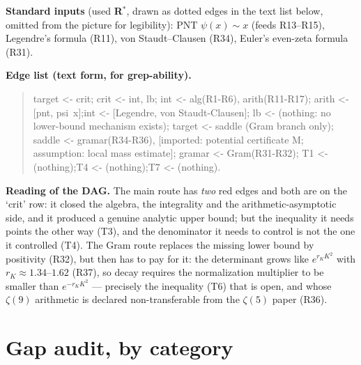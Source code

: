 \documentclass[11pt]{article}
\newcommand{\stC}{\textcolor{okgreen}{\textbf{R$^{*}$}}}
\begin{document}
\begin{center}
\end{center}

\noindent\textbf{Standard inputs} (used \stC, drawn as dotted edges in the text list below, omitted
from the picture for legibility): PNT $\psi(x)\sim x$ (feeds R13--R15), Legendre's formula (R11),
von Staudt--Clausen (R34), Euler's even-zeta formula (R31).

\noindent\textbf{Edge list (text form, for grep-ability).}
\begin{quote}\ttfamily\small
target <- crit;\newline
crit <- int, lb;\newline
int <- alg(R1-R6), arith(R11-R17);\newline
arith <- [pnt, psi~x];\quad int <- [Legendre, von Staudt-Clausen];\newline
lb <- (nothing: no lower-bound mechanism exists);\newline
target <- saddle (Gram branch only);\newline
saddle <- gramar(R34-R36), [imported: potential certificate M; assumption: local mass estimate];\newline
gramar <- Gram(R31-R32);\newline
T1 <- (nothing);\quad T4 <- (nothing);\quad T7 <- (nothing).
\end{quote}

\noindent\textbf{Reading of the DAG.} The main route has \emph{two} red edges and both are on the
`crit' row: it closed the algebra, the integrality and the arithmetic-asymptotic side, and it
produced a genuine analytic upper bound; but the inequality it needs points the other way (T3), and
the denominator it needs to control is not the one it controlled (T4). The Gram route replaces the
missing lower bound by positivity (R32), but then has to pay for it: the determinant grows like
$e^{r_KK^{2}}$ with $r_K\approx1.34$--$1.62$ (R37), so decay requires the normalization multiplier to
be smaller than $e^{-r_KK^{2}}$ --- precisely the inequality (T6) that is open, and whose $\zeta(9)$
arithmetic is declared non-transferable from the $\zeta(5)$ paper (R36).

\section{Gap audit, by category}
\label{sec:gaps}
\end{document}
